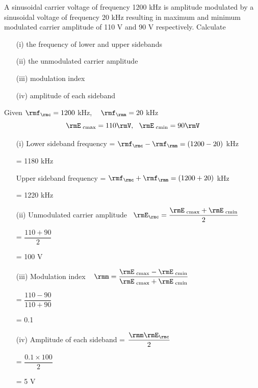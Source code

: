 \eject

\begin{problem}\label{prob8.6}
A sinusoidal carrier voltage of frequency 1200 kHz is amplitude
modulated by a sinusoidal voltage of frequency 20 kHz resulting in
maximum and minimum modulated carrier amplitude of 110 V and 90 V
respectively. Calculate
\begin{itemize}
\item[(i)] the frequency of lower and upper sidebands 
\item[(ii)] the unmodulated carrier amplitude
\item[(iii)] modulation index
\item[(iv)] amplitude of each sideband
\end{itemize}
\end{problem}

\begin{solution}
Given $\rmf_\rmc = 1200$ kHz, ~ $\rmf_\rmm = 20$ kHz
$$
\rmE_{\text{ cmax}} = 110 \rmV, ~~ \rmE_{\text{ cmin}} = 90 \rmV
$$
\begin{itemize}
\item[(i)] Lower sideband frequency = $\rmf_\rmc - \rmf_\rmm =
(1200-20)$ kHz

\smallskip
\hspace{4.1cm} = 1180 kHz

\smallskip
Upper sideband frequency = $\rmf_\rmc +\rmf_\rmm = (1200+20)$ kHz

\smallskip
\hspace{4.1cm} = 1220 kHz

\item[(ii)] Unmodulated carrier amplitude ~$\rmE_\rmc = \dfrac{\rmE_{\text{ cmax}} +
\rmE_{\text{ cmin}}}{2}$

\smallskip
\hspace{5.4cm} = $\dfrac{110+90}{2}$

\smallskip
\hspace{5.4cm} = 100 V

\smallskip
\item[(iii)] Modulation index ~ $\rmm = \dfrac{\rmE_{\text{ cmax}} - \rmE_{\text{
cmin}}}{\rmE_{\text{ cmax}} + \rmE_{\text{ cmin}}}$

\smallskip
\hspace{3.38cm} = $\dfrac{110-90}{110+90}$

\smallskip
\hspace{3.38cm} = 0.1

\smallskip
\item[(iv)] Amplitude of each sideband = $\dfrac{\rmm \rmE_\rmc}{2}$

\smallskip
\hspace{4.35cm} = $\dfrac{0.1 \times 100}{2}$

\smallskip
\hspace{4.35cm} = 5 V
\end{itemize}
\end{solution}

